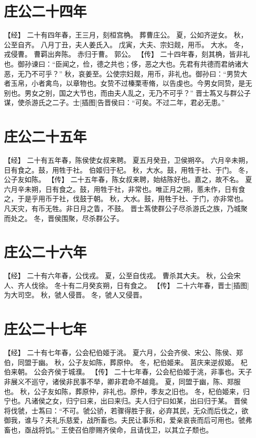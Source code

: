 \documentclass[a4paper,12pt,UTF8,twoside]{ctexbook}
\begin{document}
\section{庄公二十四年}

【经】
二十有四年春，王三月，刻桓宫桷。
葬曹庄公。
夏，公如齐逆女。
秋，公至自齐。
八月丁丑，夫人姜氏入。
戊寅，大夫、宗妇觌，用币。
大水。
冬，戎侵曹。
曹羁出奔陈。
赤归于曹。
郭公。
【传】
二十四年春，刻其桷，皆非礼也。御孙谏曰：“臣闻之，俭，德之共也；侈，恶之大也。先君有共德而君纳诸大恶，无乃不可乎？”
秋，哀姜至。公使宗妇觌，用币，非礼也。御孙曰：“男贽大者玉帛，小者禽鸟，以章物也。女贽不过榛栗枣脩，以告虔也。今男女同贽，是无别也。男女之别，国之大节也，而由夫人乱之，无乃不可乎？”
晋士蒍又与群公子谋，使杀游氏之二子。士[插图]告晋侯曰：“可矣。不过二年，君必无患。”

\section{庄公二十五年}

【经】
二十有五年春，陈侯使女叔来聘。
夏五月癸丑，卫侯朔卒。
六月辛未朔，日有食之。鼓，用牲于社。
伯姬归于杞。
秋，大水。鼓，用牲于社、于门。
冬，公子友如陈。
【传】
二十五年春，陈女叔来聘，始结陈好也。嘉之，故不名。
夏六月辛未朔，日有食之。鼓，用牲于社，非常也。唯正月之朔，慝未作，日有食之，于是乎用币于社，伐鼓于朝。
秋，大水。鼓，用牲于社、于门，亦非常也。凡天灾，有币无牲。非日月之眚，不鼓。
晋士蒍使群公子尽杀游氏之族，乃城聚而处之。
冬，晋侯围聚，尽杀群公子。

\section{庄公二十六年}

【经】
二十有六年春，公伐戎。
夏，公至自伐戎。
曹杀其大夫。
秋，公会宋人、齐人伐徐。
冬十有二月癸亥朔，日有食之。
【传】
二十六年春，晋士[插图]为大司空。
秋，虢人侵晋。
冬，虢人又侵晋。

\section{庄公二十七年}

【经】
二十有七年春，公会杞伯姬于洮。
夏六月，公会齐侯、宋公、陈侯、郑伯，同盟于幽。
秋，公子友如陈，葬原仲。
冬，杞伯姬来。
莒庆来逆叔姬。
杞伯来朝。
公会齐侯于城濮。
【传】
二十七年春，公会杞伯姬于洮，非事也。天子非展义不巡守，诸侯非民事不举，卿非君命不越竟。
夏，同盟于幽，陈、郑服也。
秋，公子友如陈，葬原仲，非礼也。原仲，季友之旧也。
冬，杞伯姬来，归宁也。凡诸侯之女，归宁曰来，出曰来归。夫人归宁曰如某，出曰归于某。
晋侯将伐虢，士蒍曰：“不可。虢公骄，若骤得胜于我，必弃其民，无众而后伐之，欲御我，谁与？夫礼乐慈爱，战所畜也。夫民让事乐和，爱亲哀丧而后可用也。虢弗畜也，亟战将饥。”
王使召伯廖赐齐侯命，且请伐卫，以其立子颓也。
\end{document}
